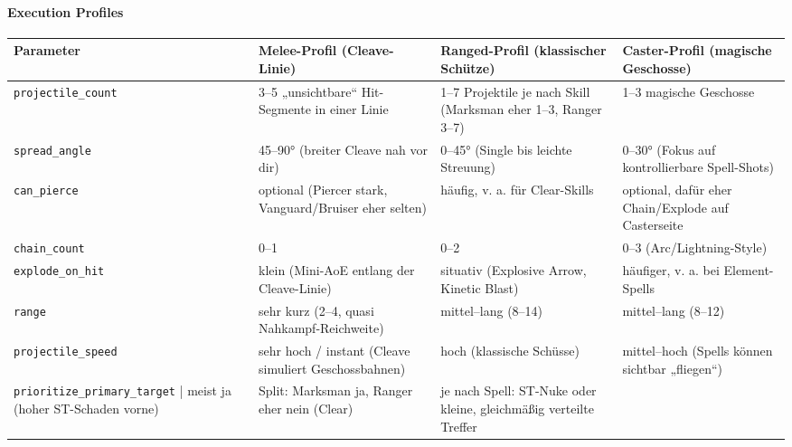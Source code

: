 \paragraph{Execution Profiles}{}
\scriptsize %
\begin{tabular}{p{3cm} | p{4cm} | p{4cm} | p{4cm}}
	Parameter             & Melee-Profil (Cleave-Linie)                                  & Ranged-Profil (klassischer Schütze)                                   & Caster-Profil (magische Geschosse)                                       \\
	\hline
	\texttt{projectile\_count}    & 3–5 „unsichtbare“ Hit-Segmente in einer Linie                & 1–7 Projektile je nach Skill (Marksman eher 1–3, Ranger 3–7)          & 1–3 magische Geschosse                                                     \\
	\texttt{spread\_angle}        & 45–90° (breiter Cleave nah vor dir)                          & 0–45° (Single bis leichte Streuung)                                    & 0–30° (Fokus auf kontrollierbare Spell-Shots)                             \\
	\texttt{can\_pierce}          & optional (Piercer stark, Vanguard/Bruiser eher selten)       & häufig, v. a. für Clear-Skills                                         & optional, dafür eher Chain/Explode auf Casterseite                        \\
	\texttt{chain\_count}         & 0–1                                                          & 0–2                                                                     & 0–3 (Arc/Lightning-Style)                                                 \\
	\texttt{explode\_on\_hit}      & klein (Mini-AoE entlang der Cleave-Linie)                    & situativ (Explosive Arrow, Kinetic Blast)                              & häufiger, v. a. bei Element-Spells                                        \\
	\texttt{range}               & sehr kurz (2–4, quasi Nahkampf-Reichweite)                   & mittel–lang (8–14)                                                     & mittel–lang (8–12)                                                         \\
	\texttt{projectile\_speed}    & sehr hoch / instant (Cleave simuliert Geschossbahnen)        & hoch (klassische Schüsse)                                              & mittel–hoch (Spells können sichtbar „fliegen“)                            \\
	\texttt{prioritize\_primary\_target} | meist ja (hoher ST-Schaden vorne)                     & Split: Marksman ja, Ranger eher nein (Clear)                           & je nach Spell: ST-Nuke oder kleine, gleichmäßig verteilte Treffer         \\
	\hline
\end{tabular}
\normalsize
